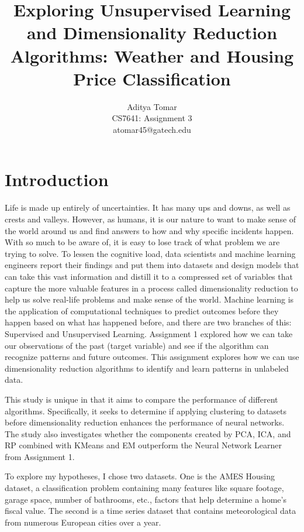 \documentclass[conference]{IEEEtran}
\title{Exploring Unsupervised Learning and Dimensionality Reduction Algorithms: Weather and Housing Price Classification}
\author{Aditya Tomar \\ CS7641: Assignment 3 \\ atomar45@gatech.edu}
\begin{document}
\maketitle

\section{Introduction} Life is made up entirely of uncertainties. It has many ups and downs, as well as crests and valleys. However, as humans, it is our nature to want to make sense of the world around us and find answers to how and why specific incidents happen. With so much to be aware of, it is easy to lose track of what problem we are trying to solve. To lessen the cognitive load, data scientists and machine learning engineers report their findings and put them into datasets and design models that can take this vast information and distill it to a compressed set of variables that capture the more valuable features in a process called dimensionality reduction to help us solve real-life problems and make sense of the world. Machine learning is the application of computational techniques to predict outcomes before they happen based on what has happened before, and there are two branches of this: Supervised and Unsupervised Learning. Assignment 1 explored how we can take our observations of the past (target variable) and see if the algorithm can recognize patterns and future outcomes. This assignment explores how we can use dimensionality reduction algorithms to identify and learn patterns in unlabeled data. 
\par This study is unique in that it aims to compare the performance of different algorithms. Specifically, it seeks to determine if applying clustering to datasets before dimensionality reduction enhances the performance of neural networks. The study also investigates whether the components created by PCA, ICA, and RP combined with KMeans and EM outperform the Neural Network Learner from Assignment 1. 
\par To explore my hypotheses, I chose two datasets. One is the AMES Housing dataset, a classification problem containing many features like square footage, garage space, number of bathrooms, etc., factors that help determine a home's fiscal value. The second is a time series dataset that contains meteorological data from numerous European cities over a year.
\end{document}
